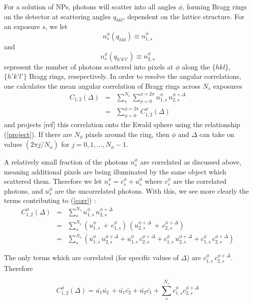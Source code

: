 \documentclass [11pt,fleqn]{article}
\def \be {\begin{equation}}
\def \ee {\end{equation}}
\def \beq {\begin{eqnarray}}
\def \eeq {\end{eqnarray}}
\begin{document}
For a solution of NPs, photons will scatter into all angles $\phi$, forming Bragg rings on the detector at scattering angles $q_{hkl}$, dependent on the lattice structure. For an exposure $s$, we let
\be
n_s^\phi (q_{hkl}) \equiv n_{1,s}^\phi
\ee
and 
\be
n_s^\phi (q_{h'k'l'}) \equiv n_{2,s}^\phi
\ee
represent the number of photons scattered into pixels at $\phi$ along the $\{hkl\}$, $\{h'k'l'\}$ Bragg rings, resepectively. In order to resolve the angular correlations, one calculates the mean angular correlation of Bragg rings across $N_s$ exposures
\beq \label{corr}
C_{1,2}( \Delta) &=& \sum _s ^ {N_s} \sum_{\phi=0}^{\phi=2\pi} n_{1,s}^\phi\, n_{2,s}^{\phi + \Delta} \\
&=& \sum_{\phi=0}^{\phi=2\pi} C_{1,2}^\phi(\Delta) 
\eeq
and projects [ref] this correlation onto the Ewald sphere using the relationship (\ref{project}). If there are $N_\phi$ pixels around the ring, then $\phi$ and $\Delta$ can take on values $(2\pi j/N_\phi)$ for $j = 0,1,. . . ,N_\phi-1$. 

A relatively small fraction of the photons $n_s^\phi$ are correlated as discussed above, meaning additional pixels are being illuminated by the same object which scattered them. Therefore we let $n_s^\phi = c_s^\phi + u_s^\phi$ where $c_s^\phi$ are the correlated photons, and $u_s^\phi$ are the uncorrelated photons. With this, we see more clearly the terms contributing to  (\ref{corr}) :
\beq
C_{1,2}^\phi(\Delta) &=& \sum_s^{N_s} n_{1,s}^\phi\, n_{2,s}^{\phi + \Delta} \\
&=& \sum_s^{N_s} \left( u_{1,s}^\phi\,+\,c_{1,s}^ \phi \right)\,\left( u_{2,s}^{ \phi+\Delta} \,+\, c_{2,s}^{\phi+\Delta} \right ) \\
&=& \sum_s^{N_s} \left( u_{1,s}^\phi\, u_{2,s}^{\phi+\Delta} + u_{1,s}^\phi\, c_{2,s}^{\phi+\Delta} + c_{1,s}^\phi\, u_{2,s}^{\phi+\Delta}  +  c_{1,s}^\phi\, c_{2,s}^{\phi+\Delta} \right )
\eeq

The only terms which are correlated (for specific values of $\Delta$) are $c_{1,s}^\phi\,c_{2,s}^{\phi+\Delta}$. Therefore

\be \label{cphi2}
C_{1,2}^\phi(\Delta) = \bar{u_1} \bar{u_2}\, + \bar{u_1}\bar{c_2}  + \bar{u_2}\bar{c_1} + \sum_s^{N_s}c_{1,s}^\phi c_{2,s}^{\phi + \Delta}
\ee
\end{document}
